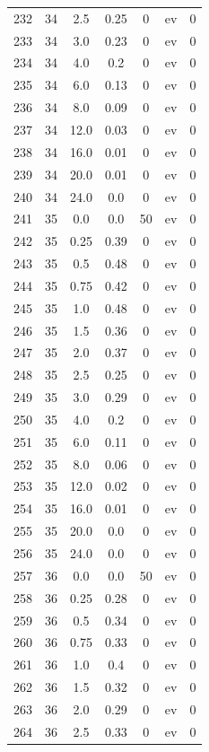 \documentclass[12pt,a4paper]{article}
\begin{document}
\begin{tabular}{r|cccccc}
	232 & 34 & 2.5 & 0.25 & 0 & ev & 0 \\
	233 & 34 & 3.0 & 0.23 & 0 & ev & 0 \\
	234 & 34 & 4.0 & 0.2 & 0 & ev & 0 \\
	235 & 34 & 6.0 & 0.13 & 0 & ev & 0 \\
	236 & 34 & 8.0 & 0.09 & 0 & ev & 0 \\
	237 & 34 & 12.0 & 0.03 & 0 & ev & 0 \\
	238 & 34 & 16.0 & 0.01 & 0 & ev & 0 \\
	239 & 34 & 20.0 & 0.01 & 0 & ev & 0 \\
	240 & 34 & 24.0 & 0.0 & 0 & ev & 0 \\
	241 & 35 & 0.0 & 0.0 & 50 & ev & 0 \\
	242 & 35 & 0.25 & 0.39 & 0 & ev & 0 \\
	243 & 35 & 0.5 & 0.48 & 0 & ev & 0 \\
	244 & 35 & 0.75 & 0.42 & 0 & ev & 0 \\
	245 & 35 & 1.0 & 0.48 & 0 & ev & 0 \\
	246 & 35 & 1.5 & 0.36 & 0 & ev & 0 \\
	247 & 35 & 2.0 & 0.37 & 0 & ev & 0 \\
	248 & 35 & 2.5 & 0.25 & 0 & ev & 0 \\
	249 & 35 & 3.0 & 0.29 & 0 & ev & 0 \\
	250 & 35 & 4.0 & 0.2 & 0 & ev & 0 \\
	251 & 35 & 6.0 & 0.11 & 0 & ev & 0 \\
	252 & 35 & 8.0 & 0.06 & 0 & ev & 0 \\
	253 & 35 & 12.0 & 0.02 & 0 & ev & 0 \\
	254 & 35 & 16.0 & 0.01 & 0 & ev & 0 \\
	255 & 35 & 20.0 & 0.0 & 0 & ev & 0 \\
	256 & 35 & 24.0 & 0.0 & 0 & ev & 0 \\
	257 & 36 & 0.0 & 0.0 & 50 & ev & 0 \\
	258 & 36 & 0.25 & 0.28 & 0 & ev & 0 \\
	259 & 36 & 0.5 & 0.34 & 0 & ev & 0 \\
	260 & 36 & 0.75 & 0.33 & 0 & ev & 0 \\
	261 & 36 & 1.0 & 0.4 & 0 & ev & 0 \\
	262 & 36 & 1.5 & 0.32 & 0 & ev & 0 \\
	263 & 36 & 2.0 & 0.29 & 0 & ev & 0 \\
	264 & 36 & 2.5 & 0.33 & 0 & ev & 0 \\

\end{tabular}
\end{document}
